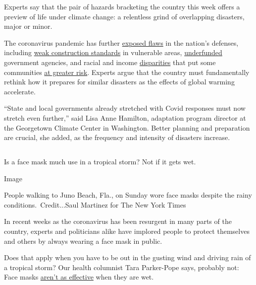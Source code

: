 Experts say that the pair of hazards bracketing the country this week
offers a preview of life under climate change: a relentless grind of
overlapping disasters, major or minor.

The coronavirus pandemic has further
\href{https://www.nytimes.com/2020/05/22/climate/fema-volunteer-disaster-response.html}{exposed
flaws} in the nation's defenses, including
\href{https://www.nytimes.com/2019/10/26/climate/building-codes-secret-deal.html}{weak
construction standards} in vulnerable areas,
\href{https://newrepublic.com/article/158486/towns-arent-equipped-handle-climate-emergencies}{underfunded}
government agencies, and racial and income
\href{https://www.nytimes.com/2020/05/17/climate/pollution-poverty-coronavirus.html}{disparities}
that put some communities
\href{https://www.nytimes.com/2020/07/24/climate/houston-flooding-race.html}{at
greater risk}. Experts argue that the country must fundamentally rethink
how it prepares for similar disasters as the effects of global warming
accelerate.

``State and local governments already stretched with Covid responses
must now stretch even further,'' said Lisa Anne Hamilton, adaptation
program director at the Georgetown Climate Center in Washington. Better
planning and preparation are crucial, she added, as the frequency and
intensity of disasters increase.

\hypertarget{-6}{%
\subsection{}\label{-6}}

Is a face mask much use in a tropical storm? Not if it gets wet.

Image

People walking to Juno Beach, Fla., on Sunday wore face masks despite
the rainy conditions.~Credit...Saul Martinez for The New York Times

In recent weeks as the coronavirus has been resurgent in many parts of
the country, experts and politicians alike have implored people to
protect themselves and others by always wearing a face mask in public.

Does that apply when you have to be out in the gusting wind and driving
rain of a tropical storm? Our health columnist Tara Parker-Pope says,
probably not: Face masks
\href{https://www.nursingtimes.net/clinical-archive/infection-control/the-effectiveness-of-surgical-face-masks-what-the-literature-shows-30-09-2003/}{aren't
as effective} when they are wet.

